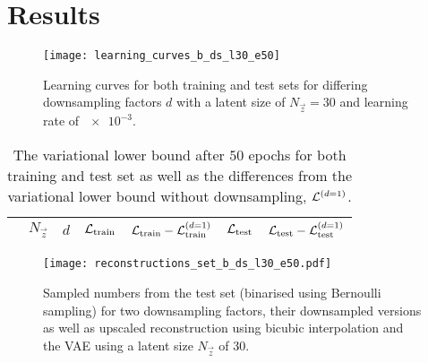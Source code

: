 \section{Results}
\label{sec:results}


\begin{figure*}
	\centering
	\texttt{[image: learning\_curves\_b\_ds\_l30\_e50]}
	\caption{Learning curves for both training and test sets for differing downsampling factors $d$ with a latent size of $N_{\vec{z}} = 30$ and learning rate of $\num{e-3}$. }
	\label{fig:learning_curves}
\end{figure*}


\begin{table*}
	\centering
	\caption{
		The variational lower bound after $50$ epochs for both training and test set as well as the differences from the variational lower bound without downsampling, $\mathcal{L}^{(d = 1)}$.
	}
	\label{tab:variational_lower_bound}
	\setlength{\tabcolsep}{1em}
	\begin{tabular}{
			l@{}
			S[table-format = 2.0]
			S[table-format = 1.0]
			S[table-format = -3.2]
			S[table-format = -3.2]
			S[table-format = -2.2]
			S[table-format = -2.2]
		}
		\toprule
		& {$N_{\vec{z}}$} & {$d$} & {$\mathcal{L}_{\text{train}}$}
		& {$\mathcal{L}_{\text{train}} - \mathcal{L}_{\text{train}}^{(d = 1)}$}
		& {$\mathcal{L}_{\text{test}}$}
		& {$\mathcal{L}_{\text{test}} - \mathcal{L}_{\text{test}}^{(d = 1)}$} \\
		\midrule
		
		\bottomrule
	\end{tabular}
\end{table*}

\begin{figure*}
	\centering
	\texttt{[image: reconstructions\_set\_b\_ds\_l30\_e50.pdf]}
	\caption{
		Sampled numbers from the test set (binarised using Bernoulli sampling) for two downsampling factors,
		their downsampled versions as well as upscaled reconstruction using bicubic interpolation and the VAE using a latent size $N_{\vec{z}}$ of 30.
	}
	\label{fig:samples}
\end{figure*}
